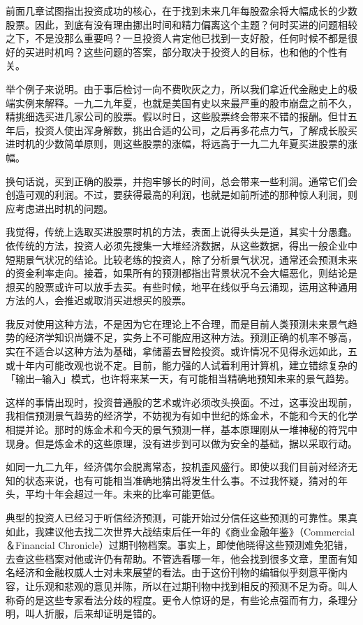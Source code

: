 \documentclass[UTF8,a4paper,zihao=-4,fontset = windows]{ctexart} %
\begin{document}
前面几章试图指出投资成功的核心，在于找到未来几年每股盈余将大幅成长的少数股票。因此，到底有没有理由挪出时间和精力偏离这个主题？何时买进的问题相较之下，不是没那么重要吗？一旦投资人肯定他已找到一支好股，任何时候不都是很好的买进时机吗？这些问题的答案，部分取决于投资人的目标，也和他的个性有关。

举个例子来说明。由于事后检讨一向不费吹灰之力，所以我们拿近代金融史上的极端实例来解释。一九二九年夏，也就是美国有史以来最严重的股市崩盘之前不久，精挑细选买进几家公司的股票。假以时日，这些股票终会带来不错的报酬。但廿五年后，投资人使出浑身解数，挑出合适的公司，之后再多花点力气，了解成长股买进时机的少数简单原则，则这些股票的涨幅，将远高于一九二九年夏买进股票的涨幅。

换句话说，买到正确的股票，并抱牢够长的时间，总会带来一些利润。通常它们会创造可观的利润。不过，要获得最高的利润，也就是如前所述的那种惊人利润，则应考虑进出时机的问题。

我觉得，传统上选取买进股票时机的方法，表面上说得头头是道，其实十分愚蠢。依传统的方法，投资人必须先搜集一大堆经济数据，从这些数据，得出一般企业中短期景气状况的结论。比较老练的投资人，除了分析景气状况，通常还会预测未来的资金利率走向。接着，如果所有的预测都指出背景状况不会大幅恶化，则结论是想买的股票或许可以放手去买。有些时候，地平在线似乎乌云涌现，运用这种通用方法的人，会推迟或取消买进想买的股票。

我反对使用这种方法，不是因为它在理论上不合理，而是目前人类预测未来景气趋势的经济学知识尚嫌不足，实务上不可能应用这种方法。预测正确的机率不够高，实在不适合以这种方法为基础，拿储蓄去冒险投资。或许情况不见得永远如此，五或十年内可能改观也说不定。目前，能力强的人试着利用计算机，建立错综复杂的「输出─输入」模式，也许将来某一天，有可能相当精确地预知未来的景气趋势。

这样的事情出现时，投资普通股的艺术或许必须改头换面。不过，这事没出现前，我相信预测景气趋势的经济学，不妨视为有如中世纪的炼金术，不能和今天的化学相提并论。那时的炼金术和今天的景气预测一样，基本原理刚从一堆神秘的符咒中现身。但是炼金术的这些原理，没有进步到可以做为安全的基础，据以采取行动。

如同一九二九年，经济偶尔会脱离常态，投机歪风盛行。即使以我们目前对经济无知的状态来说，也有可能相当准确地猜出将发生什么事。不过我怀疑，猜对的年头，平均十年会超过一年。未来的比率可能更低。

典型的投资人已经习于听信经济预测，可能开始过分信任这些预测的可靠性。果真如此，我建议他去找二次世界大战结束后任一年的《商业金融年鉴》（Commercial ＆Financial Chronicle）过期刊物档案。事实上，即使他晓得这些预测难免犯错，去查这些档案对他或许仍有帮助。不管选看哪一年，他会找到很多文章，里面有知名经济和金融权威人士对未来展望的看法。由于这份刊物的编辑似乎刻意平衡内容，让乐观和悲观的意见并陈，所以在过期刊物中找到相反的预测不足为奇。叫人称奇的是这些专家看法分歧的程度。更令人惊讶的是，有些论点强而有力，条理分明，叫人折服，后来却证明是错的。
\end{document}
